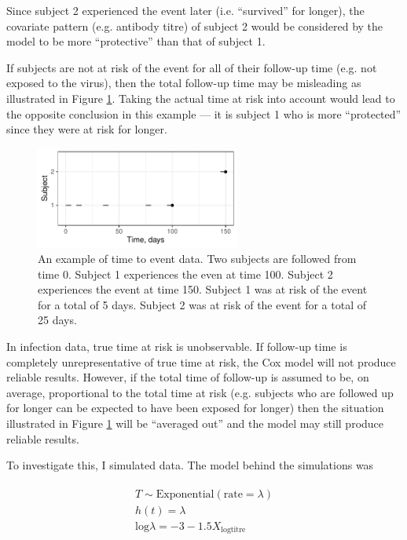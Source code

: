 \documentclass[12pt]{article}
\begin{document}
Since subject 2 experienced the event later (i.e. ``survived'' for longer), the covariate pattern (e.g. antibody titre) of subject 2 would be considered by the model to be more ``protective'' than that of subject 1.

If subjects are not at risk of the event for all of their follow-up time (e.g. not exposed to the virus), then the total follow-up time may be misleading as illustrated in Figure \ref{CoxExamplePartial}. Taking the actual time at risk into account would lead to the opposite conclusion in this example --- it is subject 1 who is more ``protected'' since they were at risk for longer.

\begin{figure}[htp]
	\centering
	\includegraphics[width=0.6\textwidth]{../curve-cox/timeplot_2_light.pdf}
	\caption{
	An example of time to event data. Two subjects are followed from time 0. Subject 1 experiences the even at time 100. Subject 2 experiences the event at time 150. Subject 1 was at risk of the event for a total of 5 days. Subject 2 was at risk of the event for a total of 25 days.
	}
	\label{CoxExamplePartial}
\end{figure}

\pagebreak

In infection data, true time at risk is unobservable. If follow-up time is completely unrepresentative of true time at risk, the Cox model will not produce reliable results. However, if the total time of follow-up is assumed to be, on average, proportional to the total time at risk (e.g. subjects who are followed up for longer can be expected to have been exposed for longer) then the situation illustrated in Figure  \ref{CoxExamplePartial} will be ``averaged out'' and the model may still produce reliable results.

To investigate this, I simulated data. The model behind the simulations was

\begin{align*}
\begin{gathered}
T \sim \text{Exponential}(\text{rate} = \lambda) \\
h(t) = \lambda \\
\text{log}\lambda = -3 - 1.5 X_{\text{logtitre}}
\end{gathered}
\end{align*}
\end{document}
